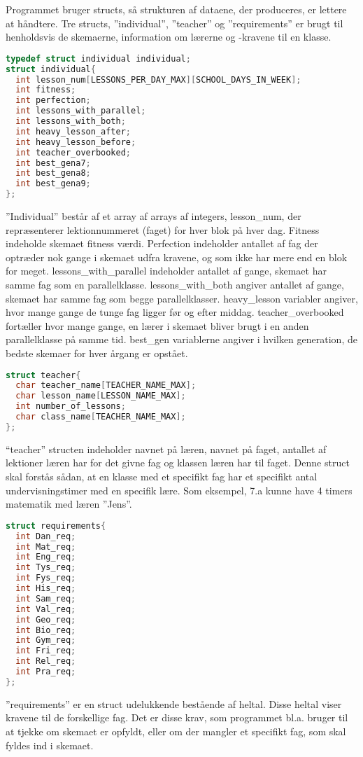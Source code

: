 Programmet bruger structs, så strukturen af dataene, der produceres, er lettere at håndtere. Tre structs, ”individual”, ”teacher” og ”requirements” er brugt til henholdsvis de skemaerne, information om lærerne og -kravene til en klasse.

\begin{lstlisting}[language = C]
typedef struct individual individual;
struct individual{
  int lesson_num[LESSONS_PER_DAY_MAX][SCHOOL_DAYS_IN_WEEK];
  int fitness;
  int perfection;
  int lessons_with_parallel;
  int lessons_with_both;
  int heavy_lesson_after;
  int heavy_lesson_before;
  int teacher_overbooked;
  int best_gena7;
  int best_gena8;
  int best_gena9;
};
\end{lstlisting}

”Individual” består af et array af arrays af integers, lesson\_num, der repræsenterer lektionnummeret (faget) for hver blok på hver dag. Fitness indeholde skemaet fitness værdi. Perfection indeholder antallet af fag der optræder nok gange i skemaet udfra kravene, og som ikke har mere end en blok for meget. lessons\_with\_parallel indeholder antallet af gange, skemaet har samme fag som en parallelklasse. lessons\_with\_both angiver antallet af gange, skemaet har samme fag som begge parallelklasser. heavy\_lesson variabler angiver, hvor mange gange de tunge fag ligger før og efter middag. teacher\_overbooked fortæller hvor mange gange, en lærer i skemaet bliver brugt i en anden parallelklasse på samme tid. best\_gen variablerne angiver i hvilken generation, de bedste skemaer for hver årgang er opstået.

\begin{lstlisting}[language = C]
struct teacher{
  char teacher_name[TEACHER_NAME_MAX];
  char lesson_name[LESSON_NAME_MAX];
  int number_of_lessons;
  char class_name[TEACHER_NAME_MAX];
};
\end{lstlisting}

“teacher” structen indeholder navnet på læren, navnet på faget, antallet af lektioner læren har for det givne fag og klassen læren har til faget. Denne struct skal forstås sådan, at en klasse med et specifikt fag har et specifikt antal undervisningstimer med en specifik lære. Som eksempel, 7.a kunne have 4 timers matematik med læren ”Jens”. 

\begin{lstlisting}[language = C]
struct requirements{
  int Dan_req;
  int Mat_req;
  int Eng_req;
  int Tys_req;
  int Fys_req;
  int His_req;
  int Sam_req;
  int Val_req;
  int Geo_req;
  int Bio_req;
  int Gym_req;
  int Fri_req;
  int Rel_req;
  int Pra_req;
};
\end{lstlisting}

”requirements” er en struct udelukkende bestående af heltal. Disse heltal viser kravene til de forskellige fag. Det er disse krav, som programmet bl.a. bruger til at tjekke om skemaet er opfyldt, eller om der mangler et specifikt fag, som skal fyldes ind i skemaet.
